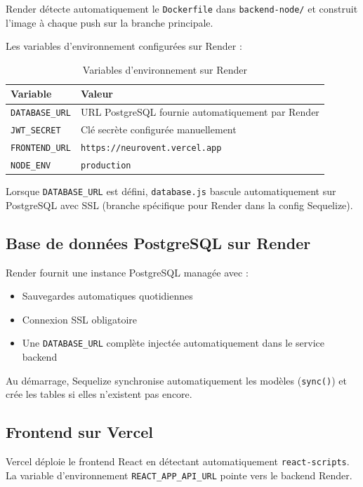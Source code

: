 \documentclass[12pt,a4paper]{article}
\begin{document}
Render détecte automatiquement le \texttt{Dockerfile} dans \texttt{backend-node/}
et construit l'image à chaque push sur la branche principale.

Les variables d'environnement configurées sur Render :

\begin{table}[H]
  \centering
  \begin{tabularx}{\textwidth}{lX}
    \toprule
    \textbf{Variable} & \textbf{Valeur} \\
    \midrule
    \texttt{DATABASE\_URL} & URL PostgreSQL fournie automatiquement par Render \\
    \texttt{JWT\_SECRET}   & Clé secrète configurée manuellement \\
    \texttt{FRONTEND\_URL} & \texttt{https://neurovent.vercel.app} \\
    \texttt{NODE\_ENV}     & \texttt{production} \\
    \bottomrule
  \end{tabularx}
  \caption{Variables d'environnement sur Render}
\end{table}

Lorsque \texttt{DATABASE\_URL} est défini, \texttt{database.js} bascule automatiquement
sur PostgreSQL avec SSL (branche spécifique pour Render dans la config Sequelize).

\subsection{Base de données PostgreSQL sur Render}

Render fournit une instance PostgreSQL managée avec :
\begin{itemize}
  \item Sauvegardes automatiques quotidiennes
  \item Connexion SSL obligatoire
  \item Une \texttt{DATABASE\_URL} complète injectée automatiquement dans le service backend
\end{itemize}

Au démarrage, Sequelize synchronise automatiquement les modèles (\texttt{sync()})
et crée les tables si elles n'existent pas encore.

\subsection{Frontend sur Vercel}

Vercel déploie le frontend React en détectant automatiquement \texttt{react-scripts}.
La variable d'environnement \texttt{REACT\_APP\_API\_URL} pointe vers le backend Render.
\end{document}
